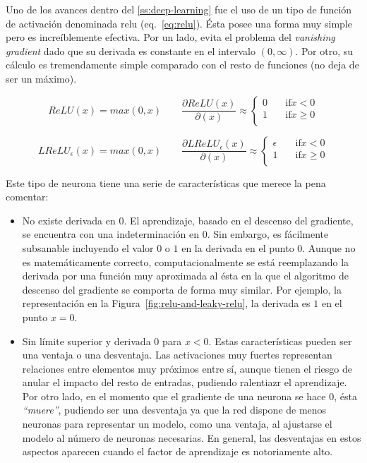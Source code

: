 Uno de los avances dentro del \ref{ss:deep-learning} fue el uso de un tipo de función de activación denominada \acrfull{relu} (eq.~\ref{eq:relu}). Ésta posee una forma muy simple pero es increíblemente efectiva. Por un lado, evita el problema del \textit{vanishing gradient} dado que su derivada es constante en el intervalo $(0, \infty)$. Por otro, su cálculo es tremendamente simple comparado con el resto de funciones (no deja de ser un máximo).

\begin{equation}
ReLU(x) = max(0, x) \qquad
\frac{\partial ReLU(x)}{\partial(x)} \approx
\begin{cases}
0 &\quad\text{if} x < 0 \\
1 &\quad\text{if} x \geq 0 \\
\end{cases}
\label{eq:relu}
\end{equation}

\begin{equation}
LReLU_\epsilon(x) = max(0, x) \qquad
\frac{\partial LReLU_\epsilon(x)}{\partial(x)} \approx
\begin{cases}
\epsilon &\quad\text{if} x < 0 \\
1 &\quad\text{if} x \geq 0 \\
\end{cases}
\label{eq:leaky-relu}
\end{equation}

Este tipo de neurona tiene una serie de características que merece la pena comentar:

\begin{itemize}
	\item No existe derivada en $0$. El aprendizaje, basado en el descenso del gradiente, se encuentra con una indeterminación en $0$. Sin embargo, es fácilmente subsanable incluyendo el valor $0$ o $1$ en la derivada en el punto $0$. Aunque no es matemáticamente correcto, computacionalmente se está reemplazando la derivada por una función muy aproximada al ésta en la que el algoritmo de descenso del gradiente se comporta de forma muy similar. Por ejemplo, la representación en la Figura~\ref{fig:relu-and-leaky-relu}, la derivada es $1$ en el punto $x = 0$.
	\item Sin límite superior y derivada $0$ para $x < 0$. Estas características pueden ser una ventaja o una desventaja. Las activaciones muy fuertes representan relaciones entre elementos muy próximos entre sí, aunque tienen el riesgo de anular el impacto del resto de entradas, pudiendo ralentiazr el aprendizaje. Por otro lado, en el momento que el gradiente de una neurona se hace 0, ésta \textit{\enquote{muere}}, pudiendo ser una desventaja ya que la red dispone de menos neuronas para representar un modelo, como una ventaja, al ajustarse el modelo al número de neuronas necesarias. En general, las desventajas en estos aspectos aparecen cuando el factor de aprendizaje es notoriamente alto.
\end{itemize}

